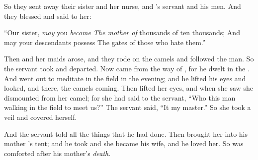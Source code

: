 \bverse So they sent away \Rebekah their sister and her nurse, and \Abraham's servant and his men.
\bverse And they blessed \Rebekah and said to her:
\begin{bquotation}
``Our sister, \textit{may} you \textit{become The mother of} thousands of ten thousands; And may your descendants possess The gates of those who hate them.''
\end{bquotation}
\bverse Then \Rebekah and her maids arose, and they rode on the camels and followed the man. So the servant took \Rebekah and departed.
\bverse Now \Isaac came from the way of , for he dwelt in the .
\bverse And \Isaac went out to meditate in the field in the evening; and he lifted his eyes and looked, and there, the camels \were coming.
\bverse Then \Rebekah lifted her eyes, and when she saw \Isaac she dismounted from her camel;
\bverse for she had said to the servant, ``Who \is this man walking in the field to meet us?'' The servant said, ``It \is my master.'' So she took a veil and covered herself.

\bverse And the servant told \Isaac all the things that he had done.
\bverse Then \Isaac brought her into his mother \Sarah's tent; and he took \Rebekah and she became his wife, and he loved her. So \Isaac was comforted after his mother's \textit{death}.

